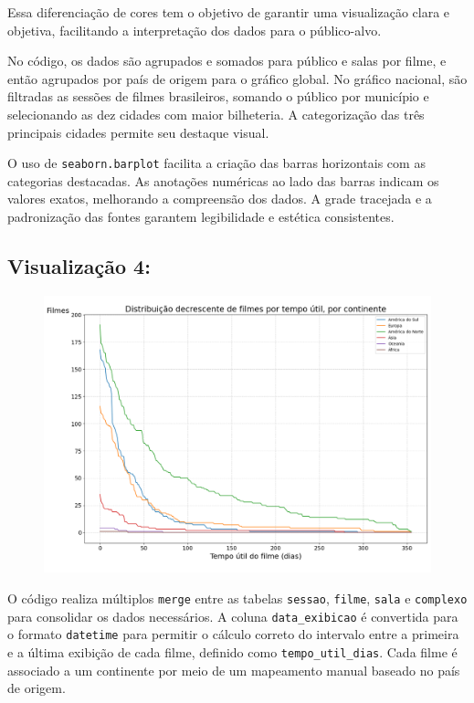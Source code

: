 \documentclass{article}
\begin{document}
Essa diferenciação de cores tem o objetivo de garantir uma visualização clara e objetiva, facilitando a interpretação dos dados para o público-alvo.

\vspace{0.3cm}

No código, os dados são agrupados e somados para público e salas por filme, e então agrupados por país de origem para o gráfico global. No gráfico nacional, são filtradas as sessões de filmes brasileiros, somando o público por município e selecionando as dez cidades com maior bilheteria. A categorização das três principais cidades permite seu destaque visual.

O uso de \texttt{seaborn.barplot} facilita a criação das barras horizontais com as categorias destacadas. As anotações numéricas ao lado das barras indicam os valores exatos, melhorando a compreensão dos dados. A grade tracejada e a padronização das fontes garantem legibilidade e estética consistentes.


\subsection*{Visualização 4:}
\begin{figure}[H]
    \centerline{\includegraphics[width = \linewidth]{img/Figure_4.png}}
\end{figure}

O código realiza múltiplos \texttt{merge} entre as tabelas \texttt{sessao}, \texttt{filme}, \texttt{sala} e \texttt{complexo} para consolidar os dados necessários. A coluna \texttt{data\_exibicao} é convertida para o formato \texttt{datetime} para permitir o cálculo correto do intervalo entre a primeira e a última exibição de cada filme, definido como \texttt{tempo\_util\_dias}. Cada filme é associado a um continente por meio de um mapeamento manual baseado no país de origem.
\end{document}
